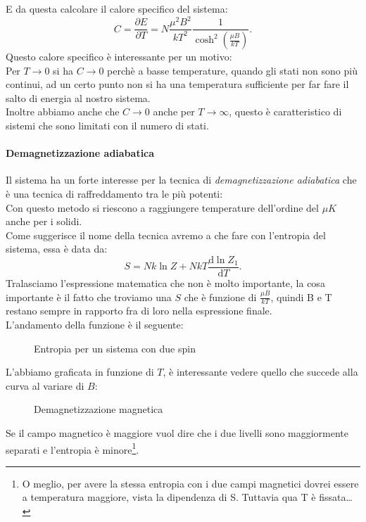 E da questa calcolare il calore specifico del sistema:
\[
	C = \frac{\partial E}{\partial T} = N \frac{\mu^2B^2}{kT^2} \frac{1}{\cosh^2\left( \frac{\mu B}{kT} \right) }
.\] 
Questo calore specifico è interessante per un motivo:\\
Per $T \rightarrow 0$ si ha $C \rightarrow 0$ perchè a basse temperature, quando gli stati non sono più continui, ad un certo punto non si ha una temperatura sufficiente per far fare il salto di energia al nostro sistema.\\
Inoltre abbiamo anche che $C \rightarrow 0 $ anche per $ T \rightarrow \infty$, questo è caratteristico di sistemi che sono limitati con il numero di stati. \\

\paragraph{Demagnetizzazione adiabatica}%
Il sistema ha un forte interesse per la tecnica di \textit{demagnetizzazione adiabatica} che è una tecnica di raffreddamento tra le più potenti:\\
Con questo metodo si riescono a raggiungere temperature dell'ordine del $\mu K$ anche per i solidi. \\
Come suggerisce il nome della tecnica avremo a che fare con l'entropia del sistema, essa è data da:
 \[
	S = Nk \ln Z + NkT \frac{\mbox{d} \ln Z_{1}}{\mbox{d} T} 
.\] 
Tralasciamo l'espressione matematica che non è molto importante, la cosa importante è il fatto che troviamo una $S$ che è funzione di $\frac{\mu B}{kT}$, quindi B e T restano sempre in rapporto fra di loro nella espressione finale.\\
L'andamento della funzione è il seguente:
\begin{figure}[H]
    \centering
    \caption{Entropia per un sistema con due spin}
    \label{fig:entropia-per-sistema-con-due-spin}
\end{figure}
\noindent
L'abbiamo graficata in funzione di $T$, è interessante vedere quello che succede alla curva al variare di $B$:
\begin{figure}[H]
    \centering
    \caption{Demagnetizzazione magnetica}
    \label{fig:demagnetizzazione-magnetica}
\end{figure}
\noindent
Se il campo magnetico è maggiore vuol dire che i due livelli sono maggiormente separati e l'entropia è minore\footnote{O meglio, per avere la stessa entropia con i due campi magnetici dovrei essere a temperatura maggiore, vista la dipendenza di S. Tuttavia qua T è fissata\ldots}.\\
